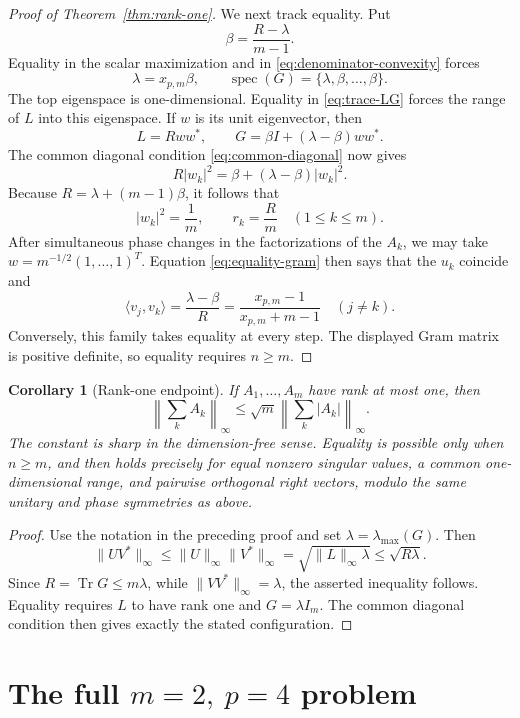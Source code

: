 \documentclass[11pt,reqno]{amsart}
\newtheorem{corollary}[theorem]{Corollary}
\theoremstyle{remark}
\newcommand{\Tr}{\operatorname{Tr}}
\begin{document}
\begin{proof}[Proof of Theorem~\ref{thm:rank-one}]
We next track equality.  Put
\[
 \beta=\frac{R-\lambda}{m-1}.
\]
Equality in the scalar maximization and in
\eqref{eq:denominator-convexity} forces
\[
 \lambda=x_{p,m}\beta,\qquad
 \operatorname{spec}(G)=\{\lambda,\beta,\ldots,\beta\}.
\]
The top eigenspace is one-dimensional.  Equality in \eqref{eq:trace-LG}
forces the range of \(L\) into this eigenspace.  If \(w\) is its unit
eigenvector, then
\begin{equation}\label{eq:equality-gram}
 L=Rww^*,\qquad
 G=\beta I+(\lambda-\beta)ww^*.
\end{equation}
The common diagonal condition \eqref{eq:common-diagonal} now gives
\[
 R|w_k|^2
 =
 \beta+(\lambda-\beta)|w_k|^2.
\]
Because \(R=\lambda+(m-1)\beta\), it follows that
\[
 |w_k|^2=\frac1m,\qquad r_k=\frac Rm
 \quad(1\le k\le m).
\]
After simultaneous phase changes in the factorizations of the \(A_k\),
we may take \(w=m^{-1/2}(1,\ldots,1)^T\).  Equation
\eqref{eq:equality-gram} then says that the \(u_k\) coincide and
\[
 \langle v_j,v_k\rangle
 =
 \frac{\lambda-\beta}{R}
 =
 \frac{x_{p,m}-1}{x_{p,m}+m-1}
 \quad(j\ne k).
\]
Conversely, this family takes equality at every step.  The displayed Gram
matrix is positive definite, so equality requires \(n\ge m\).
\end{proof}

\begin{corollary}[Rank-one endpoint]\label{cor:rank-one-infinity}
If \(A_1,\ldots,A_m\) have rank at most one, then
\[
 \left\|\sum_k A_k\right\|_\infty
 \le\sqrt m\left\|\sum_k|A_k|\right\|_\infty.
\]
The constant is sharp in the dimension-free sense.  Equality is possible only
when \(n\ge m\), and then holds precisely for equal nonzero singular values, a
common one-dimensional range, and pairwise orthogonal right vectors, modulo
the same unitary and phase symmetries as above.
\end{corollary}

\begin{proof}
Use the notation in the preceding proof and set
\(\lambda=\lambda_{\max}(G)\).  Then
\[
 \|UV^*\|_\infty
 \le\|U\|_\infty\|V^*\|_\infty
 =\sqrt{\|L\|_\infty\lambda}
 \le\sqrt{R\lambda}.
\]
Since \(R=\Tr G\le m\lambda\), while
\(\|VV^*\|_\infty=\lambda\), the asserted inequality follows.
Equality requires \(L\) to have rank one and \(G=\lambda I_m\).
The common diagonal condition then gives exactly the stated configuration.
\end{proof}

\section{The full \texorpdfstring{\(m=2,\ p=4\)}{m=2, p=4} problem}
\label{sec:p4}
\end{document}
